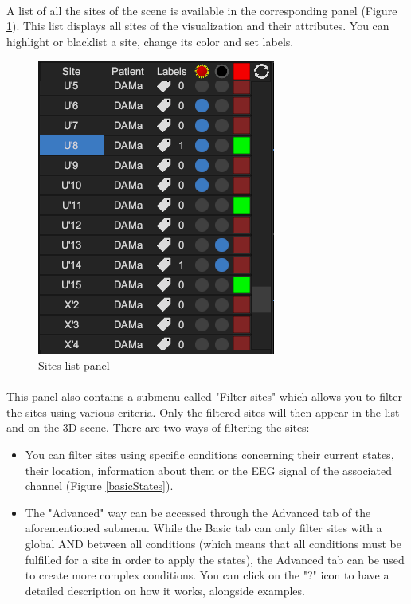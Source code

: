 \documentclass[a4paper]{article}
\begin{document}
\paragraph{} A list of all the sites of the scene is available in the corresponding panel (Figure \ref{sitesListPanel}). This list displays all sites of the visualization and their attributes. You can highlight or blacklist a site, change its color and set labels.
\begin{figure}[H]
\begin{center}
\includegraphics[scale=0.5]{SitesList.png}
\end{center}
\caption{\label{sitesListPanel}Sites list panel}
\end{figure}
\paragraph{} This panel also contains a submenu called "Filter sites" which allows you to filter the sites using various criteria. Only the filtered sites will then appear in the list and on the 3D scene. There are two ways of filtering the sites:
\begin{itemize}
\item You can filter sites using specific conditions concerning their current states, their location, information about them or the EEG signal of the associated channel (Figure \ref{basicStates}).
\item The "Advanced" way can be accessed through the Advanced tab of the aforementioned submenu. While the Basic tab can only filter sites with a global AND between all conditions (which means that all conditions must be fulfilled for a site in order to apply the states), the Advanced tab can be used to create more complex conditions. You can click on the "?" icon to have a detailed description on how it works, alongside examples.
\end{itemize}
\end{document}
